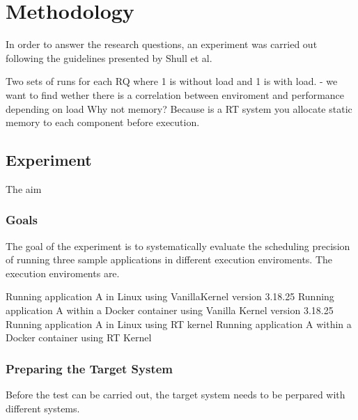 \iffalse  \fi
\chapter{Methodology}

In order to answer the research questions, an experiment was carried out following the guidelines presented by Shull et al. 

Two sets of runs for each RQ where 1 is without load and 1 is with load. 
	- we want to find wether there is a correlation between enviroment and performance depending on load 
Why not memory? Because is a RT system you allocate static memory to each component before execution. 

\section{Experiment}
The aim 

\subsection{Goals}
The goal of the experiment is to systematically evaluate the scheduling precision of running three sample applications in different execution enviroments. The execution enviroments are. 

Running application A in Linux using VanillaKernel version 3.18.25
Running application A within a Docker container using Vanilla Kernel version 3.18.25
Running application A in Linux using RT kernel 
Running application A within a Docker container using RT Kernel 

\subsection{Preparing the Target System}
Before the test can be carried out, the target system needs to be perpared with different systems. 

